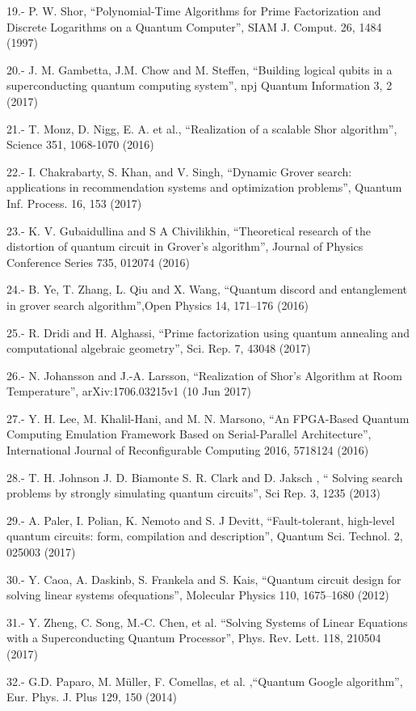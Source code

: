 19.- P. W. Shor, “Polynomial-Time Algorithms for Prime Factorization and Discrete Logarithms on a Quantum Computer”, SIAM J. Comput. 26, 1484 (1997)

20.- J. M. Gambetta, J.M. Chow and M. Steffen, “Building logical qubits in a superconducting quantum computing system”, npj Quantum Information 3, 2 (2017)

21.- T. Monz, D. Nigg, E. A. et al., “Realization of a scalable Shor algorithm”, Science 351, 1068-1070 (2016)

22.- I. Chakrabarty, S. Khan, and V. Singh, “Dynamic Grover search: applications in recommendation systems and optimization problems”, Quantum Inf. Process. 16, 153 (2017)

23.- K. V. Gubaidullina and S A Chivilikhin, “Theoretical research of the distortion of quantum circuit in Grover's algorithm”, Journal of Physics Conference Series 735, 012074 (2016)

24.- B. Ye, T. Zhang, L. Qiu and X. Wang, “Quantum discord and entanglement in grover search algorithm”,Open Physics 14, 171–176 (2016)

25.- R. Dridi and H. Alghassi, “Prime factorization using quantum annealing and computational algebraic geometry”, Sci. Rep. 7, 43048 (2017)

26.- N. Johansson and J.-A. Larsson, “Realization of Shor’s Algorithm at Room Temperature”, arXiv:1706.03215v1 (10 Jun 2017)

27.- Y. H. Lee, M. Khalil-Hani, and M. N. Marsono, “An FPGA-Based Quantum Computing Emulation Framework Based on Serial-Parallel Architecture”, International Journal of Reconfigurable Computing 2016, 5718124 (2016)

28.- T. H. Johnson J. D. Biamonte S. R. Clark and D. Jaksch , “ Solving search problems by strongly simulating quantum circuits”, Sci Rep. 3, 1235 (2013)

29.- A. Paler, I. Polian, K. Nemoto and S. J Devitt, “Fault-tolerant, high-level quantum circuits: form, compilation and description”, Quantum Sci. Technol. 2, 025003 (2017)


30.- Y. Caoa, A. Daskinb, S. Frankela and S. Kais, “Quantum circuit design for solving linear systems ofequations”, Molecular Physics 110, 1675–1680 (2012)

31.- Y. Zheng, C. Song, M.-C. Chen, et al. “Solving Systems of Linear Equations with a Superconducting Quantum Processor”, Phys. Rev. Lett. 118, 210504 (2017)

32.- G.D. Paparo, M. Müller, F. Comellas, et al. ,“Quantum Google algorithm”, Eur. Phys. J. Plus 129, 150 (2014)

